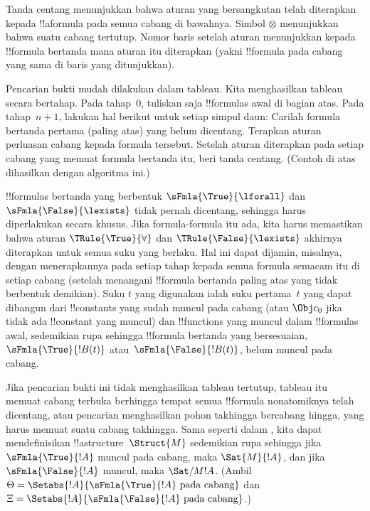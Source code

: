 \documentclass[../../../include/open-logic-section]{subfiles}
\begin{document}
Tanda centang menunjukkan bahwa aturan yang bersangkutan telah diterapkan
kepada !!a{formula} pada semua cabang di bawahnya. Simbol $\otimes$
menunjukkan bahwa suatu cabang tertutup. Nomor baris setelah aturan
menunjukkan kepada !!{formula} bertanda mana aturan itu diterapkan (yakni
!!{formula} pada cabang yang sama di baris yang ditunjukkan).

Pencarian bukti mudah dilakukan dalam tableau. Kita menghasilkan tableau
secara bertahap. Pada tahap~$0$, tuliskan saja !!{formula}s awal di bagian
atas. Pada tahap~$n+1$, lakukan hal berikut untuk setiap simpul daun:
Carilah formula bertanda pertama (paling atas) yang belum dicentang.
Terapkan aturan perluasan cabang kepada formula tersebut. Setelah aturan
diterapkan pada setiap cabang yang memuat formula bertanda itu, beri tanda
centang. (Contoh di atas dihasilkan dengan algoritma ini.)

!!{formula}s bertanda yang berbentuk $\sFmla{\True}{\lforall}$ dan
$\sFmla{\False}{\lexists}$ tidak pernah dicentang, sehingga harus
diperlakukan secara khusus. Jika formula-formula itu ada, kita harus
memastikan bahwa aturan $\TRule{\True}{\forall}$ dan
$\TRule{\False}{\lexists}$ akhirnya diterapkan untuk semua suku yang
berlaku. Hal ini dapat dijamin, misalnya, dengan menerapkannya pada setiap
tahap kepada semua formula semacam itu di setiap cabang (setelah menangani
!!{formula} bertanda paling atas yang tidak berbentuk demikian). Suku $t$
yang digunakan ialah suku pertama~$t$ yang dapat dibangun dari !!{constant}s
yang sudah muncul pada cabang (atau $\Obj c_0$ jika tidak ada
!!{constant} yang muncul) dan !!{function}s yang muncul dalam
!!{formula}s awal, sedemikian rupa sehingga !!{formula} bertanda yang
bersesuaian, $\sFmla{\True}{!B(t)}$ atau~$\sFmla{\False}{!B(t)}$, belum
muncul pada cabang.

Jika pencarian bukti ini tidak menghasilkan tableau tertutup, tableau itu
memuat cabang terbuka berhingga tempat semua !!{formula} nonatomiknya telah
dicentang, atau pencarian menghasilkan pohon takhingga bercabang hingga,
yang harus memuat suatu cabang takhingga. Sama seperti dalam
, kita dapat mendefinisikan !!a{structure}~$\Struct{M}$
sedemikian rupa sehingga jika $\sFmla{\True}{!A}$ muncul pada cabang,
maka $\Sat{M}{!A}$, dan jika $\sFmla{\False}{!A}$ muncul, maka
$\Sat/{M}{!A}$. (Ambil $\Theta =
\Setabs{!A}{\sFmla{\True}{!A} \text{ pada cabang}}$ dan $\Xi =
\Setabs{!A}{\sFmla{\False}{!A} \text{ pada cabang}}$.)
\end{document}
